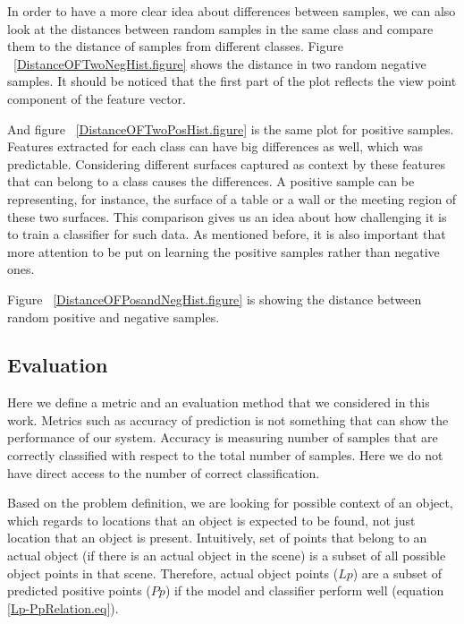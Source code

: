 In order to have a more clear idea about differences between samples, we can also look at the distances between random samples
in the same class and compare them to the distance of samples from different classes. 
Figure ~\ref{DistanceOFTwoNegHist.figure} shows the distance in two random negative samples. 
It should be noticed that the first part of the plot reflects the view point component of the feature vector.
 


And figure ~\ref{DistanceOFTwoPosHist.figure} is the same plot for positive samples. 
Features extracted for each class can have big differences as well, which was predictable. 
Considering different surfaces captured as context by these features that can belong to a class causes the differences. 
A positive sample can be representing, for instance, the surface of a table or a wall or the meeting region of these 
two surfaces. 
This comparison gives us an idea about how challenging it is to train a classifier for such data.
As mentioned before, it is also important that more attention to be put on learning the positive samples rather than 
negative ones. 



Figure ~\ref{DistanceOFPosandNegHist.figure} is showing the distance between random positive and negative samples.




\subsection{Evaluation}
\label{Evaluation.ssec}


Here we define a metric and an evaluation method that we considered in this work.
Metrics such as accuracy of prediction is not something that can show the performance of our system.
Accuracy is measuring number of samples that are correctly classified with respect to the total number of samples.
Here we do not have direct access to the number of correct classification. 

Based on the problem definition, we are looking for possible context of an object, which regards to locations that an object 
is expected to be found, not just location that an object is present.
Intuitively, set of points that belong to an actual object (if there is an actual object in the scene) is a subset of all possible 
object points in that scene.
Therefore, actual object points ($Lp$) are a subset of predicted positive points ($Pp$) if the model and classifier perform well 
(equation \ref{Lp-PpRelation.eq}).


